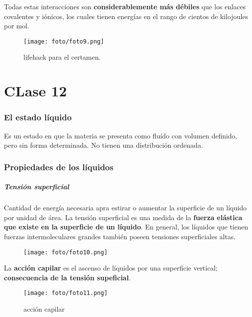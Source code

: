 \documentclass[]{article}
\begin{document}
Todas estas interacciones son \textbf{considerablemente más débiles} que los enlaces covalentes y iónicos, los cuales tienen energías en el rango de cientos de kilojoules por
mol.

\begin{figure}[H]
\center
\texttt{[image: foto/foto9.png]}
\caption{lifehack para el certamen.}
\end{figure}



\part{CLase 12}



\section{El estado líquido}
Es un estado en que la materia se presenta como fluído con volumen definido, pero sin forma determinada. No tienen una distribución ordenada.



\section{Propiedades de los líquidos}



\subsubsection{Tensión superficial}
Cantidad de energía necesaria apra estirar o aumentar la superficie de un líquido por unidad de área. La tensión superficial es una medida de la \textbf{fuerza elástica que existe en la superficie de un líquido}. En general, los líquidos que tienen fuerzas intermoleculares grandes también poseen tensiones superficiales altas.

\begin{figure}[H]
\center
\texttt{[image: foto/foto10.png]}
\end{figure}

La \textbf{acción capilar} es el ascenso de líquidos por una superficie vertical; \textbf{consecuencia de la tensión supeficial}.

\begin{figure}[H]
\center
\texttt{[image: foto/foto11.png]}
\caption{acción capilar}
\end{figure}
\end{document}
